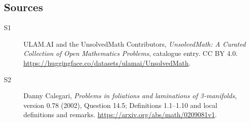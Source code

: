 \documentclass[11pt]{article}
\begin{document}
\subsection{Sources}
\begin{description}
\item[\hypertarget{source:statement:1}{S1}] ULAM.AI and the UnsolvedMath Contributors, \emph{UnsolvedMath: A Curated Collection of Open Mathematics Problems}, catalogue entry. CC BY 4.0. \url{https://huggingface.co/datasets/ulamai/UnsolvedMath}.
\item[\hypertarget{source:statement:2}{S2}] Danny Calegari, \emph{Problems in foliations and laminations of 3-manifolds}, version 0.78 (2002), Question 14.5; Definitions 1.1--1.10 and local definitions and remarks. \url{https://arxiv.org/abs/math/0209081v1}.
\end{description}
\label{end:statement}
\end{document}
